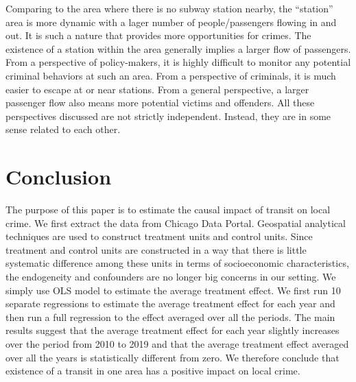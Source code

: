 \documentclass[a4paper, 11pt]{article}
\begin{document}
Comparing to the area where there is no subway station nearby, the ``station'' area is more dynamic with a lager number of people/passengers flowing in and out. It is such a nature that provides more opportunities for crimes. The existence of a station within the area generally implies a larger flow of passengers. From a perspective of policy-makers, it is highly difficult to monitor any potential criminal behaviors at such an area. From a perspective of criminals, it is much easier to escape at or near stations. From a general perspective, a larger passenger flow also means more potential victims and offenders. All these perspectives discussed are not strictly independent. Instead, they are in some sense related to each other.

\section{Conclusion} \label{sec:conclusion}

The purpose of this paper is to estimate the causal impact of transit on local crime. We first extract the data from Chicago Data Portal. Geospatial analytical techniques are used to construct treatment units and control units. Since treatment and control units are constructed in a way that there is little systematic difference among these units in terms of socioeconomic characteristics, the endogeneity and confounders are no longer big concerns in our setting. We simply use OLS model to estimate the average treatment effect. We first run 10 separate regressions to estimate the average treatment effect for each year and then run a full regression to the effect averaged over all the periods. The main results suggest that the average treatment effect for each year slightly increases over the period from 2010 to 2019 and that the average treatment effect averaged over all the years is statistically different from zero. We therefore conclude that existence of a transit in one area has a positive impact on local crime.
\end{document}
